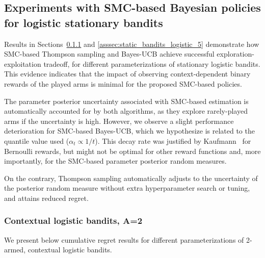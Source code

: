 
\subsection{Experiments with SMC-based Bayesian policies for logistic stationary bandits}
\label{assec:static_bandits_experiments_logistic}

Results in Sections~\ref{asssec:static_bandits_logistic_2} and \ref{asssec:static_bandits_logistic_5}
demonstrate how SMC-based Thompson sampling and Bayes-UCB achieve
successful exploration-exploitation tradeoff, 
for different parameterizations of stationary logistic bandits.
%
This evidence indicates that
the impact of observing context-dependent binary rewards of the played arms is minimal for the proposed SMC-based policies.

The parameter posterior uncertainty associated with SMC-based estimation
is automatically accounted for by both algorithms,
as they explore rarely-played arms if the uncertainty is high.
However, we observe a slight performance deterioration for SMC-based Bayes-UCB,
which we hypothesize is related to the quantile value used ($\alpha_t\propto1/t$).
This decay rate was justified by Kaufmann~\cite{ip-Kaufmann2012} for Bernoulli rewards,
but might not be optimal for other reward functions and,
more importantly, for the SMC-based parameter posterior random measures.

On the contrary, Thompson sampling automatically adjusts
to the uncertainty of the posterior random measure without extra hyperparameter search or tuning,
and attains reduced regret.

\subsubsection{Contextual logistic bandits, A=2}
\label{asssec:static_bandits_logistic_2}

We present below cumulative regret results for different parameterizations of 2-armed, contextual logistic bandits.

